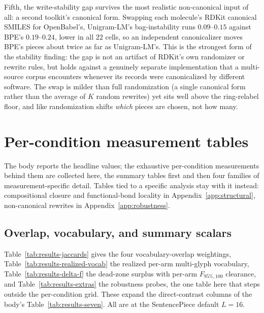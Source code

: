 \documentclass{article}
\begin{document}
Fifth, the write-stability gap survives the most realistic non-canonical input of
all: a second toolkit's canonical form. Swapping each molecule's RDKit canonical
SMILES for OpenBabel's, Unigram-LM's bag-instability runs $0.09$--$0.15$ against BPE's
$0.19$--$0.24$, lower in all $22$ cells, so an independent canonicalizer moves
BPE's pieces about twice as far as Unigram-LM's. This is the strongest form of the
stability finding: the gap is not an artifact of RDKit's own randomizer or rewrite
rules, but holds against a genuinely separate implementation that a multi-source
corpus encounters whenever its records were canonicalized by different software.
The swap is milder than full randomization (a single canonical form rather than
the average of $K$ random rewrites) yet sits well above the ring-relabel floor,
and like randomization shifts \emph{which} pieces are chosen, not how many.

\section{Per-condition measurement tables}\label{app:tables}

The body reports the headline values; the exhaustive
per-condition measurements behind them are collected here, the summary
tables first and then four families of measurement-specific detail. Tables tied
to a specific analysis stay with it instead: compositional closure and
functional-bond locality in Appendix~\ref{app:structural}, non-canonical rewrites
in Appendix~\ref{app:robustness}.

\subsection{Overlap, vocabulary, and summary scalars}\label{app:summary}

Table~\ref{tab:results-jaccards} gives the four vocabulary-overlap
weightings, Table~\ref{tab:results-realized-vocab} the realized per-arm
multi-glyph vocabulary, Table~\ref{tab:results-delta-f} the dead-zone surplus
with per-arm $F_{95\%,100}$ clearance, and Table~\ref{tab:results-extras} the
robustness probes, the one table here that steps outside the per-condition grid.
These expand the direct-contrast columns of the body's
Table~\ref{tab:results-seven}. All are at the SentencePiece default $L{=}16$.
\end{document}
